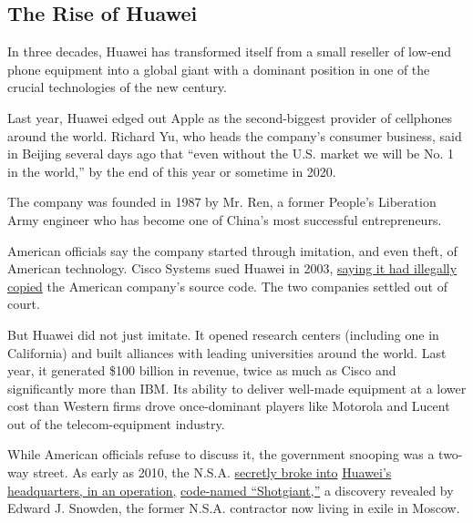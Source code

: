 \hypertarget{the-rise-of-huawei}{%
\subsection{The Rise of Huawei}\label{the-rise-of-huawei}}

In three decades, Huawei has transformed itself from a small reseller of
low-end phone equipment into a global giant with a dominant position in
one of the crucial technologies of the new century.

Last year, Huawei edged out Apple as the second-biggest provider of
cellphones around the world. Richard Yu, who heads the company's
consumer business, said in Beijing several days ago that ``even without
the U.S. market we will be No. 1 in the world,'' by the end of this year
or sometime in 2020.

The company was founded in 1987 by Mr. Ren, a former People's Liberation
Army engineer who has become one of China's most successful
entrepreneurs.

American officials say the company started through imitation, and even
theft, of American technology. Cisco Systems sued Huawei in 2003,
\href{https://www.nytimes.com/2003/10/02/business/technology-cisco-agrees-to-suspend-patent-suit-for-6-months.html}{saying
it had illegally copied} the American company's source code. The two
companies settled out of court.

But Huawei did not just imitate. It opened research centers (including
one in California) and built alliances with leading universities around
the world. Last year, it generated \$100 billion in revenue, twice as
much as Cisco and significantly more than IBM. Its ability to deliver
well-made equipment at a lower cost than Western firms drove
once-dominant players like Motorola and Lucent out of the
telecom-equipment industry.

While American officials refuse to discuss it, the government snooping
was a two-way street. As early as 2010, the N.S.A.
\href{https://www.nytimes.com/2014/03/23/world/asia/nsa-breached-chinese-servers-seen-as-spy-peril.html}{secretly
broke into}
\href{https://www.nytimes.com/2014/03/23/world/asia/nsa-breached-chinese-servers-seen-as-spy-peril.html}{Huawei's
headquarters, in an operation,}
\href{https://www.nytimes.com/2014/03/23/world/asia/nsa-breached-chinese-servers-seen-as-spy-peril.html}{code-named
``Shotgiant,''} a discovery revealed by Edward J. Snowden, the former
N.S.A. contractor now living in exile in Moscow.

